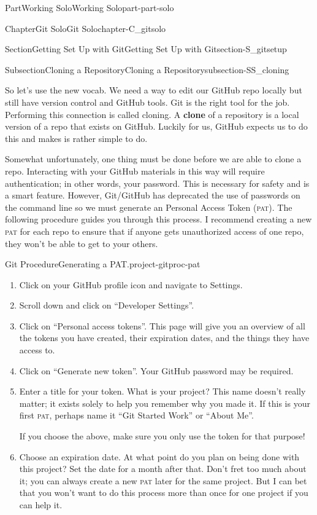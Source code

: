 \documentclass[oneside,10pt,]{book}
\newcommand{\acronym}[1]{\textsc{\MakeLowercase{#1}}}
\DeclareRobustCommand{\acronymintitle}[1]{\texorpdfstring{#1}{#1}}
\newcommand{\terminology}[1]{\textbf{#1}}
\begin{document}
\begin{partptx}{Part}{Working Solo}{}{Working Solo}{}{}{part-part-solo}
\begin{chapterptx}{Chapter}{Git Solo}{}{Git Solo}{}{}{chapter-C_gitsolo}
\begin{sectionptx}{Section}{Getting Set Up with Git}{}{Getting Set Up with Git}{}{}{section-S_gitsetup}
\begin{subsectionptx}{Subsection}{Cloning a Repository}{}{Cloning a Repository}{}{}{subsection-SS_cloning}
\par
So let's use the new vocab. We need a way to edit our GitHub repo locally but still have version control and GitHub tools. Git is the right tool for the job. Performing this connection is called cloning. A \terminology{clone} of a repository is a local version of a repo that exists on GitHub. Luckily for us, GitHub expects us to do this and makes is rather simple to do.%
\par
Somewhat unfortunately, one thing must be done before we are able to clone a repo. Interacting with your GitHub materials in this way will require authentication; in other words, your password. This is necessary for safety and is a smart feature. However, Git\slash{}GitHub has deprecated the use of passwords on the command line so we must generate an Personal Access Token (\acronym{PAT}). The following procedure guides you through this process. I recommend creating a new \acronym{PAT} for each repo to ensure that if anyone gets unauthorized access of one repo, they won't be able to get to your others.%
\begin{project}{Git Procedure}{Generating a \acronymintitle{PAT}.}{project-gitproc-pat}%
\index{github!\acronym{PAT}}%
\begin{enumerate}[font=\bfseries,label=(\alph*),ref=\alph*]%
\item{}Click on your GitHub profile icon and navigate to Settings.%
\item{}Scroll down and click on ``Developer Settings''.%
\item{}Click on ``Personal access tokens''. This page will give you an overview of all the tokens you have created, their expiration dates, and the things they have access to.%
\item{}Click on ``Generate new token''. Your GitHub password may be required.%
\item{}Enter a title for your token. What is your project? This name doesn't really matter; it exists solely to help you remember why you made it. If this is your first \acronym{PAT}, perhaps name it ``Git Started Work'' or ``About Me''.%
\par
If you choose the above, make sure you only use the token for that purpose!%
\item{}Choose an expiration date. At what point do you plan on being done with this project? Set the date for a month after that. Don't fret too much about it; you can always create a new \acronym{PAT} later for the same project. But I can bet that you won't want to do this process more than once for one project if you can help it.%

\end{enumerate}
\end{project}
\end{subsectionptx}
\end{sectionptx}
\end{chapterptx}
\end{partptx}
\end{document}
